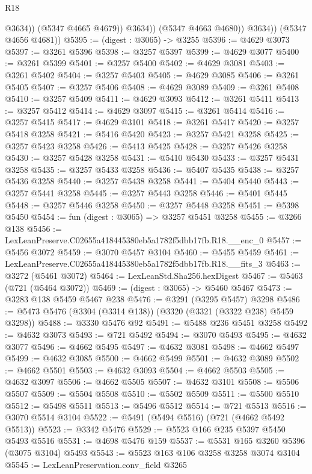 \begin{lexlean}{R18}
\begin{coremodule}
                      @3634))
                  (@5347 @4665 @4679))
                @3634))
            (@5347 @4663 @4680))
          @3634))
      (@5347 @4656 @4681))
@5395 := (digest : @3065) -> @3255
@5396 := @4629 @3073
@5397 := @3261 @5396
@5398 := @3257 @5397
@5399 := @4629 @3077
@5400 := @3261 @5399
@5401 := @3257 @5400
@5402 := @4629 @3081
@5403 := @3261 @5402
@5404 := @3257 @5403
@5405 := @4629 @3085
@5406 := @3261 @5405
@5407 := @3257 @5406
@5408 := @4629 @3089
@5409 := @3261 @5408
@5410 := @3257 @5409
@5411 := @4629 @3093
@5412 := @3261 @5411
@5413 := @3257 @5412
@5414 := @4629 @3097
@5415 := @3261 @5414
@5416 := @3257 @5415
@5417 := @4629 @3101
@5418 := @3261 @5417
@5420 := @3257 @5418 @3258
@5421 := @5416 @5420
@5423 := @3257 @5421 @3258
@5425 := @3257 @5423 @3258
@5426 := @5413 @5425
@5428 := @3257 @5426 @3258
@5430 := @3257 @5428 @3258
@5431 := @5410 @5430
@5433 := @3257 @5431 @3258
@5435 := @3257 @5433 @3258
@5436 := @5407 @5435
@5438 := @3257 @5436 @3258
@5440 := @3257 @5438 @3258
@5441 := @5404 @5440
@5443 := @3257 @5441 @3258
@5445 := @3257 @5443 @3258
@5446 := @5401 @5445
@5448 := @3257 @5446 @3258
@5450 := @3257 @5448 @3258
@5451 := @5398 @5450
@5454 := fun (digest : @3065) => @3257 @5451 @3258
@5455 := @3266 @138
@5456 := LexLeanPreserve.C02655a418445380eb5a1782f5dbb17fb.R18.__enc_0
@5457 := @5456 @3072
@5459 := @3070 @5457 @3104
@5460 := @5455 @5459
@5461 := LexLeanPreserve.C02655a418445380eb5a1782f5dbb17fb.R18.__fits_3
@5463 := @3272 (@5461 @3072)
@5464 := LexLeanStd.Sha256.hexDigest
@5467 := @5463 (@721 (@5464 @3072))
@5469 := (digest : @3065) -> @5460 @5467
@5473 := @3283 @138 @5459 @5467 @238
@5476 := @3291 (@3295 @5457) @3298
@5486 := @5473 @5476 (@3304 (@3314 @138)) (@3320 (@3321 (@3322 @238) @5459 @3298))
@5488 := @3330 @5476 @92
@5491 := @5488 @236 @5451 @3258
@5492 := @4632 @3073
@5493 := @721 @5492
@5494 := @3070 @5493
@5495 := @4632 @3077
@5496 := @4662 @5495
@5497 := @4632 @3081
@5498 := @4662 @5497
@5499 := @4632 @3085
@5500 := @4662 @5499
@5501 := @4632 @3089
@5502 := @4662 @5501
@5503 := @4632 @3093
@5504 := @4662 @5503
@5505 := @4632 @3097
@5506 := @4662 @5505
@5507 := @4632 @3101
@5508 := @5506 @5507
@5509 := @5504 @5508
@5510 := @5502 @5509
@5511 := @5500 @5510
@5512 := @5498 @5511
@5513 := @5496 @5512
@5514 := @721 @5513
@5516 := @3070 @5514 @3104
@5522 := @5491 (@5494 @5516) (@721 (@4662 @5492 @5513))
@5523 := @3342 @5476
@5529 := @5523 @166 @235 @5397 @5450 @5493 @5516
@5531 := @4698 @5476 @159
@5537 := @5531 @165 @3260 @5396 (@3075 @3104) @5493
@5543 := @5523 @163 @106 @3258 @3258 @3074 @3104
@5545 := LexLeanPreservation.conv_field @3265

\end{coremodule}
\end{lexlean}
